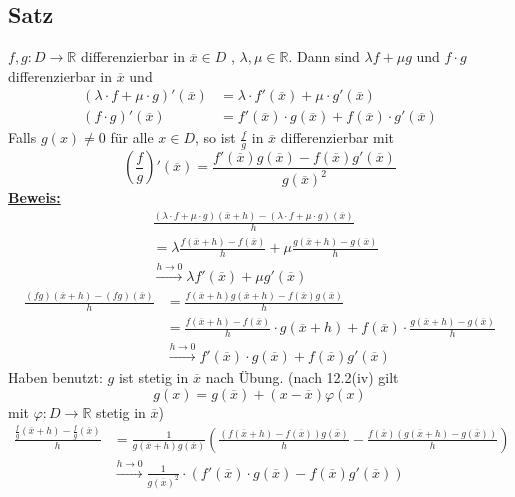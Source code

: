 \subsection{Satz} %
\label{sub:satz}
$f,g: D \to \mathds{R}$ differenzierbar in $\overline{x} \in D$ , $\lambda , \mu \in \mathds{R}$. Dann sind $\lambda f + \mu g$ und $f \cdot g$ differenzierbar in $\overline{x}$ und 
\begin{align*}
	(\lambda \cdot f + \mu \cdot g)' (\overline{x}) &= \lambda  \cdot f'(\overline{x}) + \mu \cdot g'(\overline{x}) \\
	(f \cdot g)' (\overline{x}) &= f'(\overline{x}) \cdot g(\overline{x})+ f(\overline{x}) \cdot g'(\overline{x})
\end{align*}
Falls $g(x)\not= 0$ für alle $x \in D$, so ist $\frac{f}{g} $ in $\overline{x}$ differenzierbar mit 
\[
	\left( \frac{f}{g} \right)' (\overline{x}) = \frac{ f' (\overline{x}) g(\overline{x}) - f(\overline{x}) g'(\overline{x})}{g(\overline{x})^2} 
\]
\underline{\textbf{Beweis:}} \\
\begin{align*}
	&\frac{(\lambda \cdot f + \mu \cdot g)(\overline{x} +h ) - (\lambda \cdot f + \mu \cdot  g)(\overline{x} )}{h}\\
	&= \lambda \frac{f(\overline{x}  +h )- f(\overline{x} )}{h} + \mu \frac{g(\overline{x}  +h) - g(\overline{x} )}{h} \\
	&\xrightarrow{h \to 0}  \lambda f'(\overline{x} ) + \mu g' (\overline{x} ) 
\end{align*}
\begin{align*}
  \frac{(fg) (\overline{x}  + h) - (fg)(\overline{x} )}{h} &= \frac{f(\overline{x}  +h) g(\overline{x} +h) - f(\overline{x}) g(\overline{x} )}{h}  \\
 &=  \frac{f(\overline{x} +h)- f(\overline{x} )}{h} \cdot g(\overline{x} +h) + f(\overline{x}) \cdot \frac{g(\overline{x} +h) - g(\overline{x})}{h}  \\
 &\xrightarrow{h \to 0}  f'(\overline{x}) \cdot g(\overline{x})+ f(\overline{x}) g'(\overline{x})
\end{align*}
Haben benutzt: $g$ ist stetig in $\overline{x} $ nach Übung. (nach 12.2(iv) gilt
\[
	g(x)= g(\overline{x})+ (x-\overline{x}) \varphi(x)
\] 
mit $\varphi : D \to \mathds{R}$ stetig in $\overline{x}$)
\begin{align*}
	\frac{\frac{f}{g}( \overline{x} +h) - \frac{f}{g} (\overline{x})}{h} &= \frac{1}{g(\overline{x} +h) g(\overline{x})} 
	\left( \frac{(f(\overline{x} +h)-f(\overline{x})) g(\overline{x})}{h} - \frac{f(\overline{x}) (g(\overline{x} +h)-g(\overline{x}))}{h}   \right) \\
	& \xrightarrow{h \to 0} \frac{1}{g(\overline{x})^2} \cdot  \left( f'(\overline{x}) \cdot g(\overline{x}) - f(\overline{x}) g'(\overline{x}) \right)   
\end{align*}

